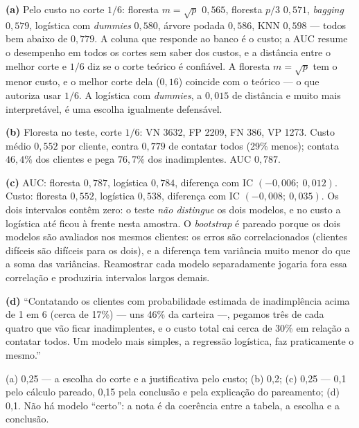 \documentclass[11pt,a4paper]{article}
\begin{document}
\begin{solucao}
\textbf{(a)} Pelo custo no corte $1/6$: floresta $m=\sqrt p$ $0{,}565$, floresta
$p/3$ $0{,}571$, \emph{bagging} $0{,}579$, logística com \emph{dummies} $0{,}580$, árvore
podada $0{,}586$, KNN $0{,}598$ --- todos bem abaixo de $0{,}779$. A coluna que
responde ao banco é o custo; a AUC resume o desempenho em todos os cortes sem saber
dos custos, e a distância entre o melhor corte e $1/6$ diz se o corte teórico é
confiável. A floresta $m=\sqrt p$ tem o menor custo, e o melhor
corte dela ($0{,}16$) coincide com o teórico --- o que autoriza usar $1/6$. A logística
com \emph{dummies}, a $0{,}015$ de distância e muito mais interpretável, é uma escolha
igualmente defensável.

\textbf{(b)} Floresta no teste, corte $1/6$: VN 3632, FP 2209, FN 386, VP 1273. Custo
médio $0{,}552$ por cliente, contra $0{,}779$ de contatar todos (29\% menos);
contata $46{,}4\%$ dos clientes e pega $76{,}7\%$ dos inadimplentes. AUC $0{,}787$.

\textbf{(c)} AUC: floresta $0{,}787$, logística $0{,}784$, diferença com IC
$(-0{,}006;\ 0{,}012)$. Custo: floresta $0{,}552$, logística $0{,}538$, diferença com IC
$(-0{,}008;\ 0{,}035)$. Os dois intervalos contêm zero: o teste \emph{não distingue} os
dois modelos, e no custo a logística até ficou à frente nesta amostra. O
\emph{bootstrap} é pareado porque os dois modelos são avaliados nos mesmos clientes:
os erros são correlacionados (clientes difíceis são difíceis para os dois), e a
diferença tem variância muito menor do que a soma das variâncias. Reamostrar cada modelo
separadamente jogaria fora essa correlação e produziria intervalos largos demais.

\textbf{(d)} ``Contatando os clientes com probabilidade estimada de inadimplência acima
de 1 em 6 (cerca de 17\%) --- uns 46\% da carteira ---, pegamos três de cada quatro que vão ficar inadimplentes, e o
custo total cai cerca de 30\% em relação a contatar todos. Um modelo mais simples, a
regressão logística, faz praticamente o mesmo.''
\end{solucao}

\begin{criterio}
(a) 0,25 --- a escolha do corte e a justificativa pelo custo; (b) 0,2; (c) 0,25 ---
0,1 pelo cálculo pareado, 0,15 pela conclusão e pela explicação do pareamento;
(d) 0,1. Não há modelo ``certo'': a nota é da coerência entre a tabela, a escolha e a
conclusão.
\end{criterio}
\end{document}
